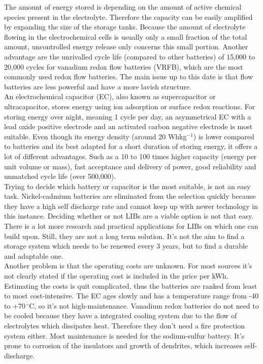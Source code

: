 \documentclass[12pt,a4paper]{article}
\begin{document}
\begin{parcolumns}[colwidths={1=2.5 cm, 2=10 cm, 3=2.5cm}]{3}
{The amount of energy stored is depending on the amount of active chemical species present in the electrolyte. Therefore the capacity can be easily amplified by expanding the size of the storage tanks. Because the amount of electrolyte flowing in the electrochemical cells is usually only a small fraction of the total amount, uncontrolled energy release only concerns this small portion. Another advantage are the unrivalled cycle life (compared to other batteries) of 15,000 to 20,000 cycles for vanadium redox flow batteries (VRFB), which are the most commonly used redox flow batteries. 
The main issue up to this date is that flow batteries are less powerful and have a more lavish structure. \\
An electrochemical capacitor (EC), also known as supercapacitor or ultracapacitor, stores energy using ion adsorption or surface redox reactions. For storing energy over night, meaning 1 cycle per day, an asymmetrical EC with a lead oxide positive electrode and an activated carbon negative electrode is most suitable. Even though its energy density (around 20 Whkg$^{-1}$) is lower compared to batteries and its best adapted for a short duration of storing energy, it offers a lot of different advantages. Such as a 10 to 100 times higher capacity (energy per unit volume or mass), fast acceptance and delivery of power, good reliability and unmatched cycle life (over 500,000).  \\
Trying to decide which battery or capacitor is the most suitable, is not an easy task. Nickel-cadmium batteries are eliminated from the selection quickly because they have a high self discharge rate and cannot keep up with newer technology in this instance. Deciding whether or not LIBs are a viable option is not that easy. There is a lot more research and practical applications for LIBs on which one can build upon. Still, they are not a long term solution. It's not the aim to find a storage system which needs to be renewed every  3 years, but to find a durable and adaptable one. \\ Another problem is that the operating costs are unknown. For most sources it's not clearly stated if the operating cost is included in the price per kWh. Estimating the costs is quit complicated, thus the batteries are ranked from least to most cost-intensive. The EC ages slowly and has a temperature range from -40 to +70\,$^\circ$C, so it's not high-maintenance. Vanadium redox batteries do not need to be cooled because they have a integrated cooling system due to the flow of electrolytes which dissipates heat. Therefore they don't need a fire protection system either. Most maintenance is needed for the sodium-sulfur battery. It's prone to corrosion of the insulators and growth of dendrites, which increases self-discharge.\\  
}
\end{parcolumns}
\end{document}

